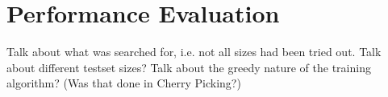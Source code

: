 \section{Performance Evaluation}
Talk about what was searched for, i.e. not all sizes had been tried out.
Talk about different testset sizes?
Talk about the greedy nature of the training algorithm? (Was that done in Cherry Picking?)










